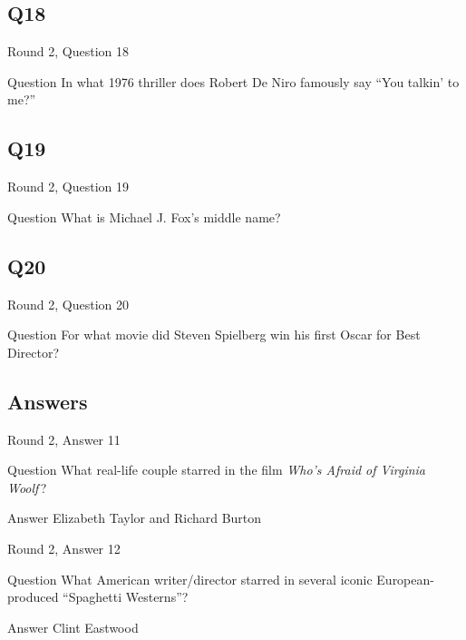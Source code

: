 \documentclass[11pt]{beamer}
\begin{document}
\subsection*{Q18}
\begin{frame}[t]{Round 2, Question 18}
\vspace{2em}
\begin{block}{Question}
In what 1976 thriller does Robert De Niro famously say ``You talkin' to me?''
\end{block}
\end{frame}
    

\subsection*{Q19}
\begin{frame}[t]{Round 2, Question 19}
\vspace{2em}
\begin{block}{Question}
What is Michael J. Fox's middle name?
\end{block}
\end{frame}
    

\subsection*{Q20}
\begin{frame}[t]{Round 2, Question 20}
\vspace{2em}
\begin{block}{Question}
For what movie did Steven Spielberg win his first Oscar for Best Director?
\end{block}
\end{frame}
    
\subsection{Answers}

\begin{frame}[t]{Round 2, Answer 11}
\vspace{2em}
\begin{block}{Question}
What real-life couple starred in the film \emph{Who's Afraid of Virginia Woolf}\,?
\end{block}
\pause{}
\begin{block}{Answer}
Elizabeth Taylor and Richard Burton
\end{block}
\end{frame}
    

\begin{frame}[t]{Round 2, Answer 12}
\vspace{2em}
\begin{block}{Question}
What American writer/director starred in several iconic European-produced ``Spaghetti Westerns''?
\end{block}
\pause{}
\begin{block}{Answer}
Clint Eastwood
\end{block}
\end{frame}
    
\end{document}
